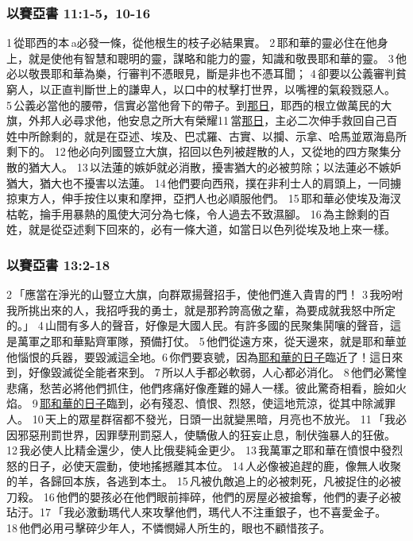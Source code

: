 \subsubsection{以賽亞書 11:1-5，10-16}
1 從耶西的本 a必發一條，從他根生的枝子必結果實。 2 耶和華的靈必住在他身上，就是使他有智慧和聰明的靈，謀略和能力的靈，知識和敬畏耶和華的靈。 3 他必以敬畏耶和華為樂，行審判不憑眼見，斷是非也不憑耳聞； 4 卻要以公義審判貧窮人，以正直判斷世上的謙卑人，以口中的杖擊打世界，以嘴裡的氣殺戮惡人。 5 公義必當他的腰帶，信實必當他脅下的帶子。到\underline{那日}，耶西的根立做萬民的大旗，外邦人必尋求他，他安息之所大有榮耀11 當\underline{那日}，主必二次伸手救回自己百姓中所餘剩的，就是在亞述、埃及、巴忒羅、古實、以攔、示拿、哈馬並眾海島所剩下的。 12 他必向列國豎立大旗，招回以色列被趕散的人，又從地的四方聚集分散的猶大人。 13 以法蓮的嫉妒就必消散，擾害猶大的必被剪除；以法蓮必不嫉妒猶大，猶大也不擾害以法蓮。 14 他們要向西飛，撲在非利士人的肩頭上，一同擄掠東方人，伸手按住以東和摩押，亞捫人也必順服他們。 15 耶和華必使埃及海汊枯乾，掄手用暴熱的風使大河分為七條，令人過去不致濕腳。 16 為主餘剩的百姓，就是從亞述剩下回來的，必有一條大道，如當日以色列從埃及地上來一樣。

\subsubsection{以賽亞書 13:2-18}
2 「應當在淨光的山豎立大旗，向群眾揚聲招手，使他們進入貴胄的門！ 3 我吩咐我所挑出來的人，我招呼我的勇士，就是那矜誇高傲之輩，為要成就我怒中所定的。」 4 山間有多人的聲音，好像是大國人民。有許多國的民聚集鬨嚷的聲音，這是萬軍之耶和華點齊軍隊，預備打仗。 5 他們從遠方來，從天邊來，就是耶和華並他惱恨的兵器，要毀滅這全地。6 你們要哀號，因為\underline{耶和華的日子}臨近了！這日來到，好像毀滅從全能者來到。 7 所以人手都必軟弱，人心都必消化。 8 他們必驚惶悲痛，愁苦必將他們抓住，他們疼痛好像產難的婦人一樣。彼此驚奇相看，臉如火焰。 9 \underline{耶和華的日子}臨到，必有殘忍、憤恨、烈怒，使這地荒涼，從其中除滅罪人。 10 天上的眾星群宿都不發光，日頭一出就變黑暗，月亮也不放光。 11 「我必因邪惡刑罰世界，因罪孽刑罰惡人，使驕傲人的狂妄止息，制伏強暴人的狂傲。 12 我必使人比精金還少，使人比俄斐純金更少。 13 我萬軍之耶和華在憤恨中發烈怒的日子，必使天震動，使地搖撼離其本位。 14 人必像被追趕的鹿，像無人收聚的羊，各歸回本族，各逃到本土。 15 凡被仇敵追上的必被刺死，凡被捉住的必被刀殺。 16 他們的嬰孩必在他們眼前摔碎，他們的房屋必被搶奪，他們的妻子必被玷汙。17 「我必激動瑪代人來攻擊他們，瑪代人不注重銀子，也不喜愛金子。 18 他們必用弓擊碎少年人，不憐憫婦人所生的，眼也不顧惜孩子。

